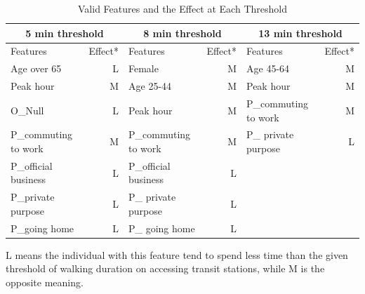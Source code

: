 \documentclass[Journal,letterpaper]{ascelike-new}
\begin{document}
\begin{table}[htbp]
\caption{Valid Features and the Effect at Each Threshold}
\label{table:3}
\centering
\begin{tabular}{lrlrlr}
\hline\hline
\multicolumn{2}{c}{5 min threshold} & \multicolumn{2}{c}{8 min threshold} & \multicolumn{2}{c}{13 min threshold} \\
\hline
Features 	& Effect* 	& Features 	& Effect*		& Features 	& Effect* \\
Age over 65 			& L	& Female				& M	& Age 45-64				& M	\\
Peak hour				& M	& Age 25-44 			& M	& Peak hour 			& M	\\
O\_Null					& L	& Peak hour				& M	& P\_commuting to work 	& M \\
P\_commuting to work	& M	& P\_commuting to work  & M	& P\_ private purpose 	& L \\
P\_official business	& L & P\_official business	& L	&       				&  	\\
P\_private purpose		& L & P\_ private purpose	& L &       				&  	\\
P\_going home 			& L & P\_ going home 		& L &       				&   \\
\hline\hline
\end{tabular}
\normalsize
%
\begin{description}
\label{note:1}
\item[*Note:]
L means the individual with this feature tend to spend less time than the given threshold of walking duration on accessing transit stations, while M is the opposite meaning.
\end{description}
\end{table}
%


\end{document}
